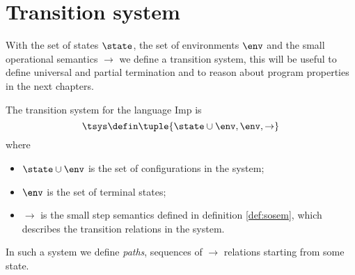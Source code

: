 \section{Transition system}

With the set of states \(\state\), the set of environments \(\env\)
and the small operational semantics \(\to\) we define a transition
system, this will be useful to define universal and partial
termination and to reason about program properties in the next
chapters.

\begin{definition} The transition system for the
  language Imp is
  \[\tsys \defin \tuple{\state \cup \env, \env, \to}\] where
  \begin{itemize}
  \item \(\state \cup \env\) is the set of configurations in the system;
  \item \(\env\) is the set of terminal states;
  \item \(\to\) is the small step semantics defined in definition
    \ref{def:sosem}, which describes the transition relations in the
    system.
  \end{itemize}
\end{definition}
\noindent
In such a system we define \emph{paths}, sequences of \(\to\)
relations starting from some state.

